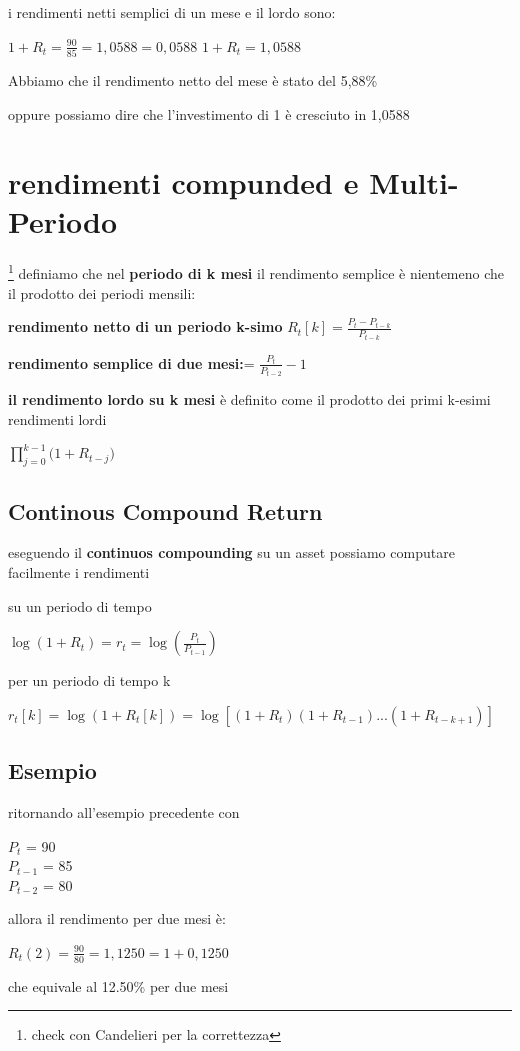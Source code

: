 \documentclass[a4paper,11pt]{report}
\begin{document}
{	i rendimenti netti semplici di un mese e il lordo sono:
\begin{center}
	$1+R_t={\frac{90}{85}} = 1,0588= 0,0588$ \newline
	$1+R_t = 1,0588$
\end{center}
	Abbiamo che il rendimento netto del mese è stato del 5,88\%

	oppure possiamo dire che l'investimento di 1 è cresciuto in 1,0588
\section{rendimenti compunded e Multi-Periodo} \footnote{check con Candelieri per la correttezza}
	definiamo che nel \textbf{periodo di k mesi} il rendimento semplice è nientemeno che il prodotto dei periodi mensili:

	\textbf{rendimento netto di un periodo k-simo}	$R_t[k]= {\frac{P_t-P_{t-k}}{P_{t-k}}} $

	\textbf{rendimento semplice di due mesi:}= ${\frac {P_t}{P_{t-2}}} - 1 $

	\textbf{il rendimento lordo su k mesi } è definito come il prodotto dei primi k-esimi rendimenti lordi
\begin{center}
	${\prod\limits_{j=0}^{k-1}({1+R_{t-j}}})$
\end{center}
\subsection{Continous Compound Return}
	eseguendo  il \textbf{continuos compounding} su un asset possiamo computare facilmente i rendimenti

	su un periodo di tempo
\begin{center}
	$\log{(1+R_t)} = r_t =\log{({\frac {P_t}{P_{t-1}}})}$
\end{center}
	per un periodo di tempo k
\begin{center}
	$r_t[k]= \log{(1+R_t[k])} =\log{[(1+R_t)(1+R_{t-1})  ...(1+R_{t-k+1})]}$
\end{center}
\subsection{Esempio}
	ritornando all'esempio precedente con
	\begin{center}
	$P_t$ = 90  \\
	$P_{t-1}$ = 85 \\
	$P_{t-2}$ = 80 \\
	\end{center}
	allora il rendimento per due mesi è:
	\begin{center}
	$R_t(2) = {\frac {90}{80}}  = 1,1250=1+0,1250 $
	\end{center}
	che equivale al 12.50\% per due mesi

}
\end{document}
